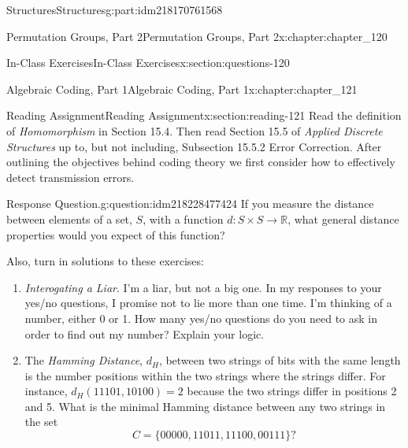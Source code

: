 \documentclass[oneside,10pt,]{book}
\numberwithin{equation}{section}
\begin{document}
\begin{partptx}{Structures}{}{Structures}{}{}{g:part:idm218170761568}
\begin{chapterptx}{Permutation Groups, Part 2}{}{Permutation Groups, Part 2}{}{}{x:chapter:chapter_120}
\begin{sectionptx}{In-Class Exercises}{}{In-Class Exercises}{}{}{x:section:questions-120}
\begin{enumerate}[label=\arabic*.]
\end{enumerate}
%
\end{sectionptx}
\end{chapterptx}
%
\typeout{************************************************}
\typeout{************************************************}
%
\begin{chapterptx}{Algebraic Coding, Part 1}{}{Algebraic Coding, Part 1}{}{}{x:chapter:chapter_121}
\index{}%
%
%
\typeout{************************************************}
\typeout{************************************************}
%
\begin{sectionptx}{Reading Assignment}{}{Reading Assignment}{}{}{x:section:reading-121}
Read the definition of \emph{Homomorphism} in Section 15.4. Then read Section 15.5 of \emph{Applied Discrete Structures} up to, but not including, Subsection 15.5.2 Error Correction. After outlining the objectives behind coding theory we first consider how to effectively detect transmission errors.%
\begin{question}{Response Question.}{g:question:idm218228477424}%
If you measure the distance between elements of a set, \(S\), with a function \(d: S\times S \rightarrow \mathbb{R}\), what general distance properties would you expect of this function?%
\end{question}
Also, turn in solutions to these exercises:%
\begin{enumerate}[label=\arabic*.]
\item{}\emph{Interogating a Liar}.  I'm a liar, but not a big one.  In my responses to your yes\slash{}no questions, I promise not to lie more than one time.  I'm thinking of a number, either 0 or 1.  How many yes\slash{}no questions do you need to ask in order to find out my number? Explain your logic.%
\item{}The \emph{Hamming Distance}, \(d_H\), between two strings of bits with the same length is the number positions within the two strings where the strings differ.  For instance, \(d_H(11101,10100)=2\) because the two strings differ in positions 2 and 5.  What is the minimal Hamming distance between any two strings in the set%
\begin{equation*}
C =\{00000,11011,11100,00111\}?
\end{equation*}
%
\end{enumerate}
%
\end{sectionptx}
%
%
\typeout{************************************************}

\end{chapterptx}
\end{partptx}
\end{document}
